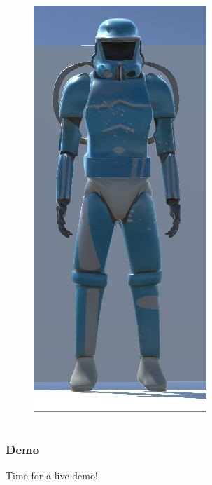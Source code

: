 \documentclass[xcolor=dvipsnames]{beamer}
\begin{document}
\begin{frame}
\begin{columns}[T]
\begin{column}{0.3\textwidth}
\begin{figure}[ht]
					\includegraphics[scale=0.455]{images/interim/character}
				\end{figure}
			\end{column}
		\end{columns}
	\end{frame}
	
	\begin{frame}
		\frametitle{Demo}
		\centering
		\Huge
		Time for a live demo!
	\end{frame}
\end{document}
